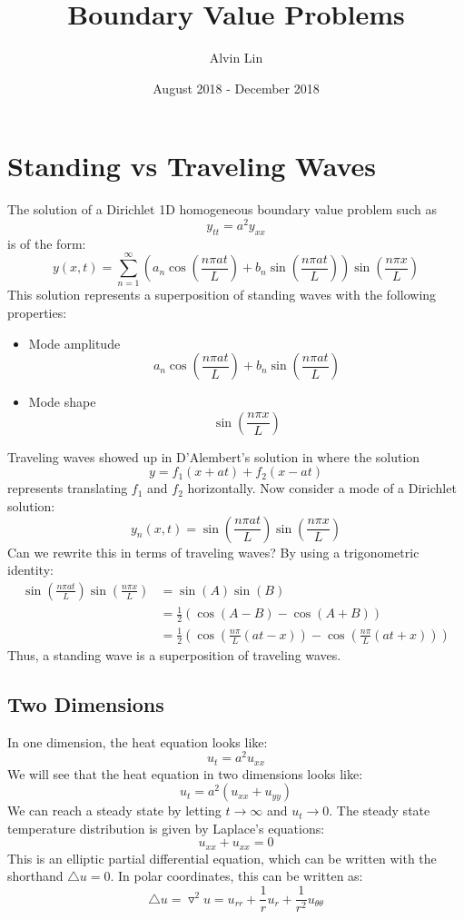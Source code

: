 \documentclass{math}
\title{Boundary Value Problems}
\author{Alvin Lin}
\date{August 2018 - December 2018}
\begin{document}
\maketitle

\section*{Standing vs Traveling Waves}
The solution of a Dirichlet 1D homogeneous boundary value problem such as
\[ y_{tt} = a^2y_{xx} \]
is of the form:
\[ y(x,t) = \sum_{n=1}^{\infty}
  (a_n\cos(\frac{n\pi at}{L})+b_n\sin(\frac{n\pi at}{L}))
  \sin(\frac{n\pi x}{L}) \]
This solution represents a superposition of standing waves with the following
properties:
\begin{itemize}
  \item Mode amplitude
  \[ a_n\cos(\frac{n\pi at}{L})+b_n\sin(\frac{n\pi at}{L}) \]
  \item Mode shape
  \[ \sin(\frac{n\pi x}{L}) \]
\end{itemize}
Traveling waves showed up in D'Alembert's solution in where the solution
\[ y = f_1(x+at)+f_2(x-at) \]
represents translating \( f_1 \) and \( f_2 \) horizontally. Now consider a
mode of a Dirichlet solution:
\[ y_n(x,t) = \sin(\frac{n\pi at}{L})\sin(\frac{n\pi x}{L}) \]
Can we rewrite this in terms of traveling waves? By using a trigonometric
identity:
\begin{align*}
  \sin(\frac{n\pi at}{L})\sin(\frac{n\pi x}{L}) &= \sin(A)\sin(B) \\
  &= \frac{1}{2}(\cos(A-B)-\cos(A+B)) \\
  &= \frac{1}{2}(\cos(\frac{n\pi}{L}(at-x))-\cos(\frac{n\pi}{L}(at+x)))
\end{align*}
Thus, a standing wave is a superposition of traveling waves.

\subsection*{Two Dimensions}
In one dimension, the heat equation looks like:
\[ u_t = a^2u_{xx} \]
We will see that the heat equation in two dimensions looks like:
\[ u_t = a^2(u_{xx}+u_{yy}) \]
We can reach a steady state by letting \( t\to\infty \) and \( u_t\to0 \).
The steady state temperature distribution is given by Laplace's equations:
\[ u_{xx}+u_{xx} = 0 \]
This is an elliptic partial differential equation, which can be written with
the shorthand \( \triangle u = 0 \). In polar coordinates, this can be written
as:
\[ \triangle u = \triangledown^2 u =
  u_{rr}+\frac{1}{r}u_r+\frac{1}{r^2}u_{\theta\theta} \]
\end{document}
